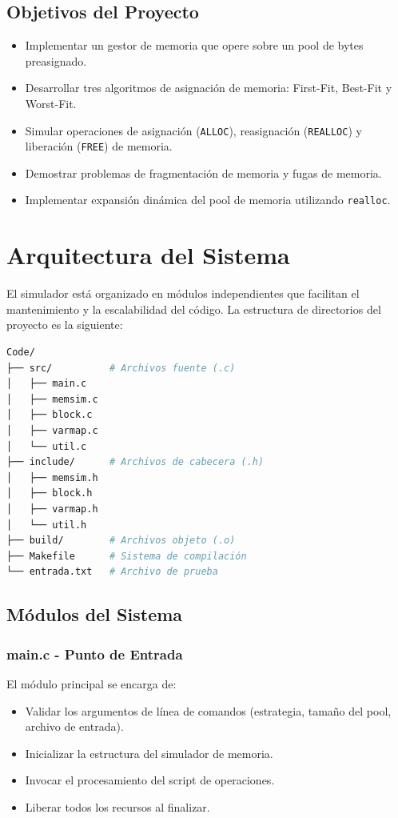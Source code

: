 \documentclass[12pt,a4paper]{article}
\begin{document}
\subsection{Objetivos del Proyecto}

\begin{itemize}
    \item Implementar un gestor de memoria que opere sobre un pool de bytes preasignado.
    \item Desarrollar tres algoritmos de asignación de memoria: First-Fit, Best-Fit y Worst-Fit.
    \item Simular operaciones de asignación (\texttt{ALLOC}), reasignación (\texttt{REALLOC}) y liberación (\texttt{FREE}) de memoria.
    \item Demostrar problemas de fragmentación de memoria y fugas de memoria.
    \item Implementar expansión dinámica del pool de memoria utilizando \texttt{realloc}.
\end{itemize}

\section{Arquitectura del Sistema}

El simulador está organizado en módulos independientes que facilitan el mantenimiento y la escalabilidad del código. La estructura de directorios del proyecto es la siguiente:

\begin{lstlisting}[language=bash]
Code/
├── src/          # Archivos fuente (.c)
│   ├── main.c
│   ├── memsim.c
│   ├── block.c
│   ├── varmap.c
│   └── util.c
├── include/      # Archivos de cabecera (.h)
│   ├── memsim.h
│   ├── block.h
│   ├── varmap.h
│   └── util.h
├── build/        # Archivos objeto (.o)
├── Makefile      # Sistema de compilación
└── entrada.txt   # Archivo de prueba
\end{lstlisting}

\subsection{Módulos del Sistema}

\subsubsection{main.c - Punto de Entrada}

El módulo principal se encarga de:
\begin{itemize}
    \item Validar los argumentos de línea de comandos (estrategia, tamaño del pool, archivo de entrada).
    \item Inicializar la estructura del simulador de memoria.
    \item Invocar el procesamiento del script de operaciones.
    \item Liberar todos los recursos al finalizar.
\end{itemize}
\end{document}
